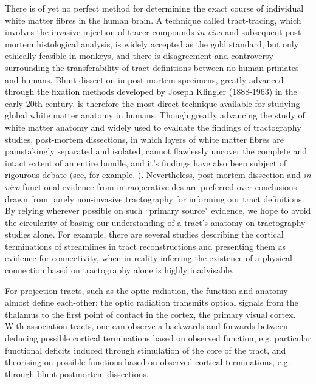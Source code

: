There is of yet no perfect method for determining the exact course of individual white matter fibres in the human brain.
A technique called tract-tracing, which involves the invasive injection of tracer compounds \textit{in vivo} and subsequent post-mortem histological analysis, is widely accepted as the gold standard, but only ethically feasible in monkeys, and there is disagreement and controversy surrounding the transferability of tract definitions between no-human primates and humans.\autocite{Becker2022,ThiebautdeSchotten2012}
Blunt dissection in post-mortem specimens, greatly advanced through the fixation methods developed by Joseph Klingler (1888-1963) in the early 20th century,\autocite{Agrawal2011} is therefore the most direct technique available for studying global white matter anatomy in humans.
Though greatly advancing the study of white matter anatomy and widely used to evaluate the findings of tractography studies, post-mortem dissections, in which layers of white matter fibres are painstakingly separated and isolated, cannot flawlessly uncover the complete and intact extent of an entire bundle,\autocite{Martino2010, Dick2012} and it's findings have also been subject of rigourous debate (see, for example, \textcite{Giampiccolo2022a,Becker2022,Giampiccolo2022b}).
Nevertheless, post-mortem dissection and \textit{in vivo} functional evidence from intraoperative \gls{des} are preferred over conclusions drawn from purely non-invasive tractography for informing our tract definitions.
By relying wherever possible on such ``primary source" evidence, we hope to avoid the circularity of basing our understanding of a tract's anatomy on tractography studies alone.%
For example, there are several studies describing the cortical terminations of streamlines in tract reconstructions and presenting them as evidence for connectivity,\autocite{Conner2018,Hau2016} when in reality inferring the existence of a physical connection based on tractography alone is highly inadvisable.\autocite{Rheault2020}

For projection tracts, such as the optic radiation, the function and anatomy almost define each-other: the optic radiation transmits optical signals from the thalamus to the first point of contact in the cortex, the primary visual cortex.
With association tracts, one can observe a backwards and forwards between deducing possible cortical terminations based on observed function, e.g. particular functional deficits induced through stimulation of the core of the tract, and theorising on possible functions based on observed cortical terminations, e.g. through blunt postmortem dissections.

